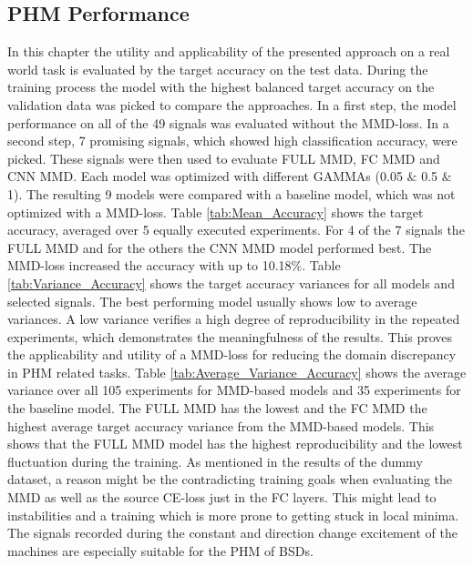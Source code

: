 \subsection{PHM Performance}\label{ch:PHM_performance}

In this chapter the utility and applicability of the presented approach on a real world task is evaluated by the target accuracy on the test data. During the training process the model with the highest balanced target accuracy on the validation data was picked to compare the approaches. In a first step, the model performance on all of the 49 signals was evaluated without the MMD-loss. In a second step, 7 promising signals, which showed high classification accuracy, were picked. These signals were then used to evaluate FULL MMD, FC MMD and CNN MMD. Each model was optimized with different GAMMAs (0.05 $\&$ 0.5 $\&$ 1). The resulting 9 models were compared with a baseline model, which was not optimized with a MMD-loss. Table \ref{tab:Mean_Accuracy} shows the target accuracy, averaged over 5 equally executed experiments. For 4 of the 7 signals the FULL MMD and for the others the CNN MMD model performed best. The MMD-loss increased the accuracy with up to 10.18$\%$. Table \ref{tab:Variance_Accuracy} shows the target accuracy variances for all models and selected signals. The best performing model usually shows low to average variances. A low variance verifies a high degree of reproducibility in the repeated experiments, which demonstrates the meaningfulness of the results. This proves the applicability and utility of a MMD-loss for reducing the domain discrepancy in PHM related tasks. Table \ref{tab:Average_Variance_Accuracy} shows the average variance over all 105 experiments for MMD-based models and 35 experiments for the baseline model. The FULL MMD has the lowest and the FC MMD the highest average target accuracy variance from the MMD-based models. This shows that the FULL MMD model has the highest reproducibility and the lowest fluctuation during the training. As mentioned in the results of the dummy dataset, a reason might be the contradicting training goals when evaluating the MMD as well as the source CE-loss just in the FC layers. This might lead to instabilities and a training which is more prone to getting stuck in local minima. The signals recorded during the constant and direction change excitement of the machines are especially suitable for the PHM of BSDs. 



